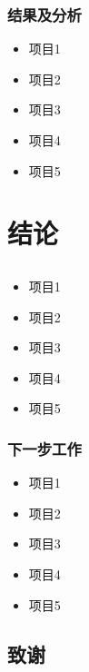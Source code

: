 \documentclass{beamer}
\begin{document}
\begin{frame}
  \frametitle{结果及分析}
        \begin{itemize}[<+-|alert@+>]
        \item
        项目1
        \item
        项目2
        \item
        项目3
        \item
        项目4
        \item
        项目5
        \end{itemize}
\end{frame}

\section{结论}

\subsection{\secname}

\begin{frame}
  \frametitle{\subsecname}
        \begin{itemize}[<+-|alert@+>]
        \item
        项目1
        \item
        项目2
        \item
        项目3
        \item
        项目4
        \item
        项目5
        \end{itemize}
\end{frame}

\begin{frame}
  \frametitle{下一步工作}
        \begin{itemize}[<+-|alert@+>]
        \item
        项目1
        \item
        项目2
        \item
        项目3
        \item
        项目4
        \item
        项目5
        \end{itemize}
\end{frame}

\subsection*{致谢}
\end{document}
